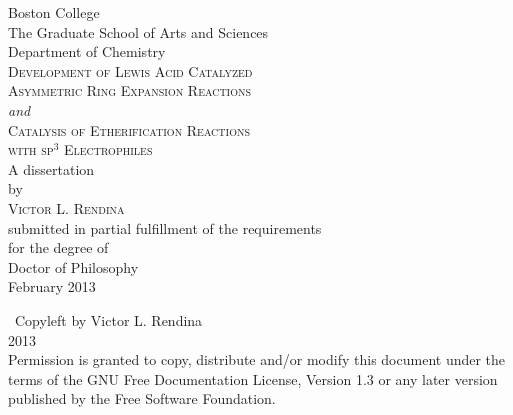\thispagestyle{empty}
\begin{center}
\doublespacing
Boston College \\ 
The Graduate School of Arts and Sciences \\
Department of Chemistry \\
\vspace{35mm}
\textsc{{\Large Development of Lewis Acid
Catalyzed \\ Asymmetric Ring Expansion Reactions}}\\
\textit{and} \\
\textsc{{\Large Catalysis of Etherification Reactions \\with sp$^3$
Electrophiles}}\\
\vspace{25mm}
A dissertation \\
by \\
\textsc{Victor L. Rendina} \\
\vspace{20mm}
submitted in partial fulfillment of the requirements \\
for the degree of \\
Doctor of Philosophy \\
\vspace{5mm}
February 2013

\pagebreak
\thispagestyle{empty}
\null
\vfill
\textcopyleft~Copyleft by Victor L. Rendina \\ 2013 \\
\footnotesize{Permission is granted to copy, distribute and/or modify this document
    under the terms of the GNU Free Documentation License, Version 1.3
    or any later version published by the Free Software Foundation.}

\end{center}
